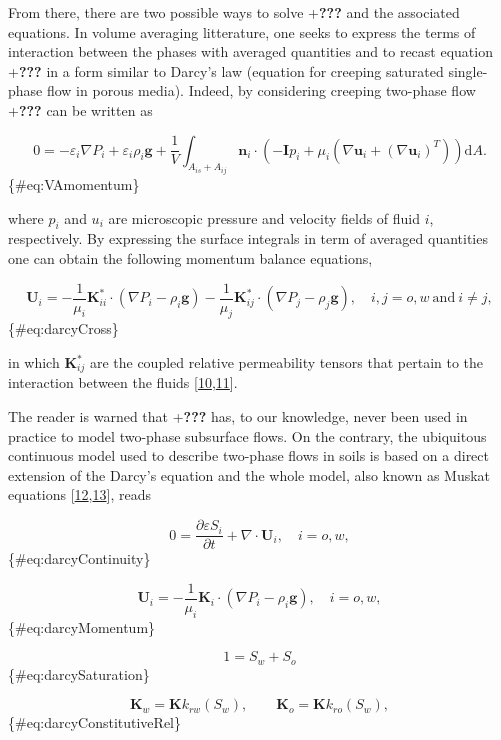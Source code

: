 \documentclass[]{article}
\begin{document}
From there, there are two possible ways to solve +\textbf{???} and the
associated equations. In volume averaging litterature, one seeks to
express the terms of interaction between the phases with averaged
quantities and to recast equation +\textbf{???} in a form similar to
Darcy's law (equation for creeping saturated single-phase flow in porous
media). Indeed, by considering creeping two-phase flow +\textbf{???} can
be written as

\[
0=-\varepsilon_{i}\nabla P_{i}+\varepsilon_{i}\rho_{i}\mathbf{g}+\frac{1}{V}\int_{A_{is}+A_{ij}}\mathbf{n}_{i}\cdot\left(-\mathbf{I}p_{i}+\mu_{i}\left(\nabla\mathbf{u}_{i}+\left(\nabla\mathbf{u}_{i}\right)^{T}\right)\right)\mathrm{d}A.
\] \{\#eq:VAmomentum\}

where \(p_i\) and \(u_i\) are microscopic pressure and velocity fields
of fluid \(i\), respectively. By expressing the surface integrals in
term of averaged quantities one can obtain the following momentum
balance equations,

\[
\mathbf{U}_{i}=-\frac{1}{\mu_{i}}\mathbf{K}_{ii}^{*}\cdot(\nabla P_{i}-\rho_{i}\mathbf{g})-\frac{1}{\mu_{j}}\mathbf{K}_{ij}^{*}\cdot(\nabla P_{j}-\rho_{j}\mathbf{g}),\quad i,j=o,w\:\mathrm{and}\:i\neq j,
\] \{\#eq:darcyCross\}

in which \(\mathbf{K}_{ij}^{*}\) are the coupled relative permeability
tensors that pertain to the interaction between the fluids
{[}\protect\hyperlink{ref-Whitaker1986a}{10},\protect\hyperlink{ref-Lasseux1996}{11}{]}.

The reader is warned that +\textbf{???} has, to our knowledge, never
been used in practice to model two-phase subsurface flows. On the
contrary, the ubiquitous continuous model used to describe two-phase
flows in soils is based on a direct extension of the Darcy's equation
and the whole model, also known as Muskat equations
{[}\protect\hyperlink{ref-wyckoff1936flow}{12},\protect\hyperlink{ref-muskat1938flow}{13}{]},
reads

\[
0=\frac{\partial\varepsilon S_{i}}{\partial t}+\nabla\cdot\mathbf{U}_{i},\quad i=o,w,
\] \{\#eq:darcyContinuity\}

\[
\mathbf{U}_{i}=-\frac{1}{\mu_{i}}\mathbf{K}_{i}\cdot(\nabla P_{i}-\rho_{i}\mathbf{g}),\quad i=o,w,
\] \{\#eq:darcyMomentum\}

\[
1=S_{w}+S_{o}
\] \{\#eq:darcySaturation\}

\[
\mathbf{K}_{w}=\mathbf{K}k_{rw}(S_{w}),\qquad\mathbf{K}_{o}=\mathbf{K}k_{ro}(S_{w}),
\] \{\#eq:darcyConstitutiveRel\}
\end{document}
